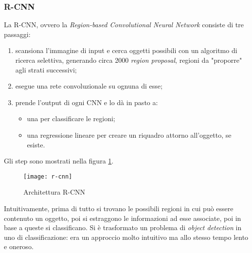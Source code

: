 \subsubsection*{R-CNN}
La R-CNN, ovvero la \textit{Region-based Convolutional Neural Network} consiste di tre passaggi:
\begin{enumerate}
	\item scansiona l'immagine di input e cerca oggetti possibili con un algoritmo di ricerca selettiva, generando circa 2000 \textit{region proposal}, regioni da "proporre" agli strati successivi;
	\item esegue una rete convoluzionale su ognuna di esse;
	\item prende l'output di ogni CNN e lo dà in pasto a:
	\begin{itemize}
		\item una  per classificare le regioni;
		\item una \gls{regressione lineare} per creare un riquadro attorno all'oggetto, se esiste.
	\end{itemize}
\end{enumerate}
Gli step sono mostrati nella figura \ref{img:r-cnn_architecture}.
\begin{figure}[H] 
	\centering
	\texttt{[image: r-cnn]} 
	\caption{Architettura R-CNN}
	\label{img:r-cnn_architecture}
\end{figure}
Intuitivamente, prima di tutto si trovano le possibili regioni in cui può essere contenuto un oggetto, poi si estraggono le informazioni ad esse associate, poi in base a queste si classificano. Si è trasformato un problema di \textit{object detection} in uno di classificazione: era un approccio molto intuitivo ma allo stesso tempo lento e oneroso.

